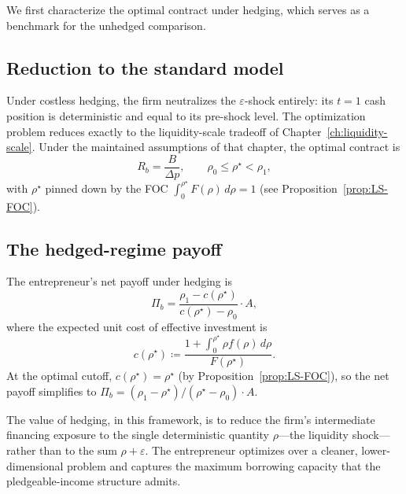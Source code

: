\documentclass[11pt,a4paper,oneside]{book}
\def\leq{\leqslant}
\theoremstyle{plain}
\theoremstyle{definition}
\theoremstyle{remark}
\numberwithin{equation}{chapter}
\begin{document}
We first characterize the optimal contract under hedging, which serves as a benchmark for the unhedged comparison.

\subsection{Reduction to the standard model}

Under costless hedging, the firm neutralizes the $\varepsilon$-shock entirely: its $t=1$ cash position is deterministic and equal to its pre-shock level.
The optimization problem reduces exactly to the liquidity-scale tradeoff of Chapter~\ref{ch:liquidity-scale}.
Under the maintained assumptions of that chapter, the optimal contract is
\begin{equation}\label{eq:RM-hedged-contract}
  R_b = \frac{B}{\Delta p},
  \qquad
  \rho_0 \leq \rho^\star < \rho_1,
\end{equation}
with $\rho^\star$ pinned down by the FOC $\int_0^{\rho^\star} F(\rho) \, d\rho = 1$ (see Proposition~\ref{prop:LS-FOC}).

\subsection{The hedged-regime payoff}

The entrepreneur's net payoff under hedging is
\begin{equation}\label{eq:RM-hedged-payoff}
  \Pi_b = \frac{\rho_1 - c(\rho^\star)}{c(\rho^\star) - \rho_0} \cdot A,
\end{equation}
where the expected unit cost of effective investment is
\begin{equation}\label{eq:RM-c-hedged}
  c(\rho^\star) \coloneqq \frac{1 + \int_0^{\rho^\star} \rho f(\rho) \, d\rho}{F(\rho^\star)}.
\end{equation}
At the optimal cutoff, $c(\rho^\star) = \rho^\star$ (by Proposition~\ref{prop:LS-FOC}), so the net payoff simplifies to $\Pi_b = (\rho_1 - \rho^\star)/(\rho^\star - \rho_0) \cdot A$.

The value of hedging, in this framework, is to reduce the firm's intermediate financing exposure to the single deterministic quantity $\rho$---the liquidity shock---rather than to the sum $\rho + \varepsilon$.
The entrepreneur optimizes over a cleaner, lower-dimensional problem and captures the maximum borrowing capacity that the pledgeable-income structure admits.

\end{document}
